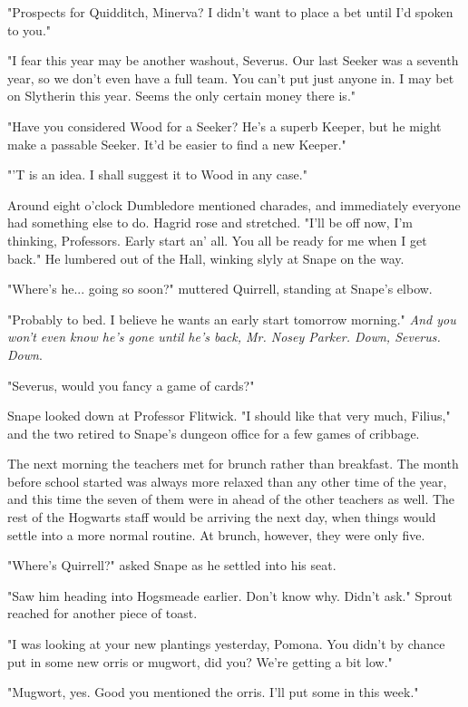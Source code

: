 \documentclass[a4paper,11pt]{article}
\begin{document}
"Prospects for Quidditch, Minerva? I didn't want to place a bet until I'd spoken to you."

"I fear this year may be another washout, Severus. Our last Seeker was a seventh year, so we don't even have a full team. You can't put just anyone in. I may bet on Slytherin this year. Seems the only certain money there is."

"Have you considered Wood for a Seeker? He's a superb Keeper, but he might make a passable Seeker. It'd be easier to find a new Keeper."

"'T is an idea. I shall suggest it to Wood in any case."

Around eight o'clock Dumbledore mentioned charades, and immediately everyone had something else to do. Hagrid rose and stretched. "I'll be off now, I'm thinking, Professors. Early start an' all. You all be ready for me when I get back." He lumbered out of the Hall, winking slyly at Snape on the way.

"Where's he... going so soon?" muttered Quirrell, standing at Snape's elbow.

"Probably to bed. I believe he wants an early start tomorrow morning." \emph{And you won't even know he's gone until he's back, Mr. Nosey Parker. Down, Severus. Down}.

"Severus, would you fancy a game of cards?"

Snape looked down at Professor Flitwick. "I should like that very much, Filius," and the two retired to Snape's dungeon office for a few games of cribbage.

The next morning the teachers met for brunch rather than breakfast. The month before school started was always more relaxed than any other time of the year, and this time the seven of them were in ahead of the other teachers as well. The rest of the Hogwarts staff would be arriving the next day, when things would settle into a more normal routine. At brunch, however, they were only five.

"Where's Quirrell?" asked Snape as he settled into his seat.

"Saw him heading into Hogsmeade earlier. Don't know why. Didn't ask." Sprout reached for another piece of toast.

"I was looking at your new plantings yesterday, Pomona. You didn't by chance put in some new orris or mugwort, did you? We're getting a bit low."

"Mugwort, yes. Good you mentioned the orris. I'll put some in this week."
\end{document}
